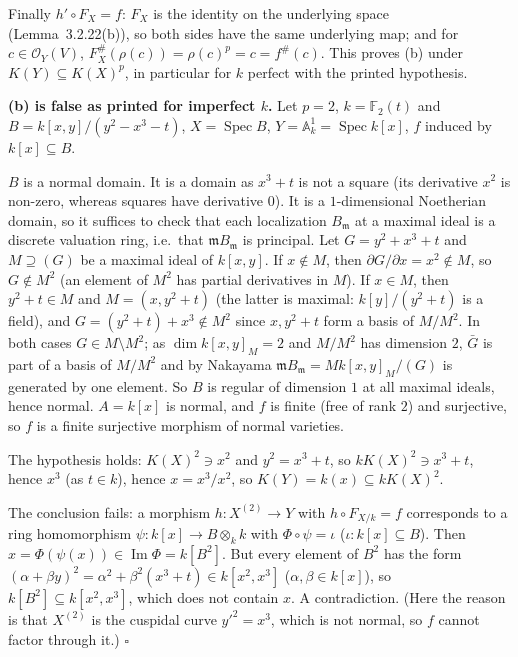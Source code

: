 \documentclass[11pt]{article}
\begin{document}
Finally $h'\circ F_X=f$: $F_X$ is the identity on the underlying space (Lemma~3.2.22(b)), so both sides have the same underlying map; and for $c\in\mathcal O_Y(V)$, $F_X^\#(\rho(c))=\rho(c)^p=c=f^\#(c)$. This proves (b) under $K(Y)\subseteq K(X)^p$, in particular for $k$ perfect with the printed hypothesis.

\textbf{(b) is false as printed for imperfect $k$.} Let $p=2$, $k=\mathbb F_2(t)$ and $B=k[x,y]/(y^2-x^3-t)$, $X=\operatorname{Spec}B$, $Y=\mathbb A^1_k=\operatorname{Spec}k[x]$, $f$ induced by $k[x]\subseteq B$.

$B$ is a normal domain. It is a domain as $x^3+t$ is not a square (its derivative $x^2$ is non-zero, whereas squares have derivative $0$). It is a $1$-dimensional Noetherian domain, so it suffices to check that each localization $B_{\mathfrak m}$ at a maximal ideal is a discrete valuation ring, i.e.\ that $\mathfrak mB_{\mathfrak m}$ is principal. Let $G=y^2+x^3+t$ and $M\supseteq(G)$ be a maximal ideal of $k[x,y]$. If $x\notin M$, then $\partial G/\partial x=x^2\notin M$, so $G\notin M^2$ (an element of $M^2$ has partial derivatives in $M$). If $x\in M$, then $y^2+t\in M$ and $M=(x,y^2+t)$ (the latter is maximal: $k[y]/(y^2+t)$ is a field), and $G=(y^2+t)+x^3\notin M^2$ since $x,y^2+t$ form a basis of $M/M^2$. In both cases $G\in M\setminus M^2$; as $\dim k[x,y]_M=2$ and $M/M^2$ has dimension $2$, $\bar G$ is part of a basis of $M/M^2$ and by Nakayama $\mathfrak mB_{\mathfrak m}=M k[x,y]_M/(G)$ is generated by one element. So $B$ is regular of dimension $1$ at all maximal ideals, hence normal. $A=k[x]$ is normal, and $f$ is finite (free of rank $2$) and surjective, so $f$ is a finite surjective morphism of normal varieties.

The hypothesis holds: $K(X)^2\ni x^2$ and $y^2=x^3+t$, so $kK(X)^2\ni x^3+t$, hence $x^3$ (as $t\in k$), hence $x=x^3/x^2$, so $K(Y)=k(x)\subseteq kK(X)^2$.

The conclusion fails: a morphism $h:X^{(2)}\to Y$ with $h\circ F_{X/k}=f$ corresponds to a ring homomorphism $\psi:k[x]\to B\otimes_kk$ with $\Phi\circ\psi=\iota$ ($\iota:k[x]\subseteq B$). Then $x=\Phi(\psi(x))\in\operatorname{Im}\Phi=k[B^2]$. But every element of $B^2$ has the form $(\alpha+\beta y)^2=\alpha^2+\beta^2(x^3+t)\in k[x^2,x^3]$ ($\alpha,\beta\in k[x]$), so $k[B^2]\subseteq k[x^2,x^3]$, which does not contain $x$. A contradiction. (Here the reason is that $X^{(2)}$ is the cuspidal curve $y'^2=x^3$, which is not normal, so $f$ cannot factor through it.) \hfill$\square$
\end{document}
